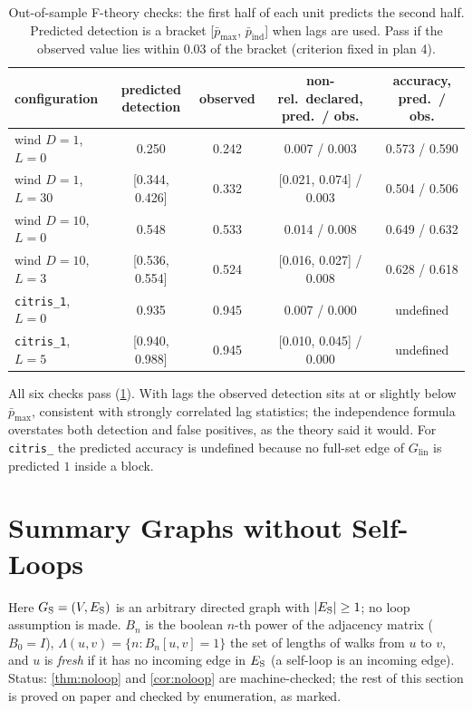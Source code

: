 \begin{table}
\caption{Out-of-sample F-theory checks: the first half of each unit predicts the second half. Predicted detection is a bracket [$\bar p_{\max}$, $\bar p_{\mathrm{ind}}$] when lags are used. Pass if the observed value lies within 0.03 of the bracket (criterion fixed in plan 4).}
\label{tab:fcheck}
\centering
\setlength{\tabcolsep}{4pt}
\begin{tabular}{lcccc}
\toprule
configuration & predicted detection & observed & non-rel.\ declared, pred.\ / obs. & accuracy, pred.\ / obs. \\
\midrule
wind $D{=}1$, $L{=}0$ & 0.250 & 0.242 & 0.007 / 0.003 & 0.573 / 0.590 \\
wind $D{=}1$, $L{=}30$ & [0.344, 0.426] & 0.332 & [0.021, 0.074] / 0.003 & 0.504 / 0.506 \\
wind $D{=}10$, $L{=}0$ & 0.548 & 0.533 & 0.014 / 0.008 & 0.649 / 0.632 \\
wind $D{=}10$, $L{=}3$ & [0.536, 0.554] & 0.524 & [0.016, 0.027] / 0.008 & 0.628 / 0.618 \\
\texttt{citris\_1}, $L{=}0$ & 0.935 & 0.945 & 0.007 / 0.000 & undefined \\
\texttt{citris\_1}, $L{=}5$ & [0.940, 0.988] & 0.945 & [0.010, 0.045] / 0.000 & undefined \\
\bottomrule
\end{tabular}
\end{table}

All six checks pass (\cref{tab:fcheck}). With lags the observed detection sits at or slightly below $\bar p_{\max}$, consistent with strongly correlated lag statistics; the independence formula overstates both detection and false positives, as the theory said it would.
For \texttt{citris\_} the predicted accuracy is undefined because no full-set edge of $G_{\mathrm{lin}}$ is predicted $1$ inside a block.

\section{Summary Graphs without Self-Loops}
\label{app:noloop}

Here $G_{\mathrm S}=(V,E_{\mathrm S})$ is an arbitrary directed graph with $|E_{\mathrm S}|\ge1$; no loop
assumption is made. $B_n$ is the boolean $n$-th power of the adjacency matrix
($B_0=I$), $\Lambda(u,v)=\{n:B_n[u,v]=1\}$ the set of lengths of walks from $u$
to $v$, and $u$ is \emph{fresh} if it has no incoming edge in $E_{\mathrm S}$ (a self-loop
is an incoming edge). Status: \cref{thm:noloop} and \cref{cor:noloop} are
machine-checked; the rest of this section is proved on paper and checked by
enumeration, as marked.

